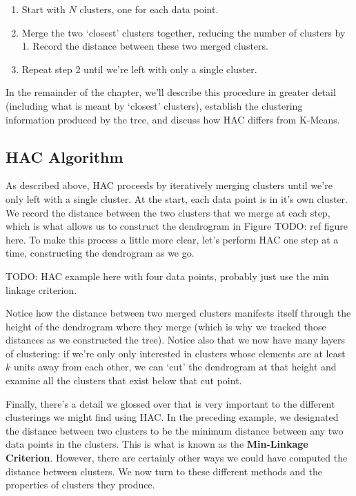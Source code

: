 \begin{enumerate}
    \item Start with $N$ clusters, one for each data point.
    \item Merge the two `closest' clusters together, reducing the number of clusters by 1. Record the distance between these two merged clusters.
    \item Repeat step 2 until we're left with only a single cluster.
\end{enumerate}

In the remainder of the chapter, we'll describe this procedure in greater detail (including what is meant by `closest' clusters), establish the clustering information produced by the tree, and discuss how HAC differs from K-Means.

\subsection{HAC Algorithm}
As described above, HAC proceeds by iteratively merging clusters until we're only left with a single cluster. At the start, each data point is in it's own cluster. We record the distance between the two clusters that we merge at each step, which is what allows us to construct the dendrogram in Figure TODO: ref figure here. To make this process a little more clear, let's perform HAC one step at a time, constructing the dendrogram as we go.

TODO: HAC example here with four data points, probably just use the min linkage criterion.

Notice how the distance between two merged clusters manifests itself through the height of the dendrogram where they merge (which is why we tracked those distances as we constructed the tree). Notice also that we now have many layers of clustering: if we're only only interested in clusters whose elements are at least $k$ units away from each other, we can `cut' the dendrogram at that height and examine all the clusters that exist below that cut point.

Finally, there's a detail we glossed over that is very important to the different clusterings we might find using HAC. In the preceding example, we designated the distance between two clusters to be the minimum distance between any two data points in the clusters. This is what is known as the \textbf{Min-Linkage Criterion}. However, there are certainly other ways we could have computed the distance between clusters. We now turn to these different methods and the properties of clusters they produce.

